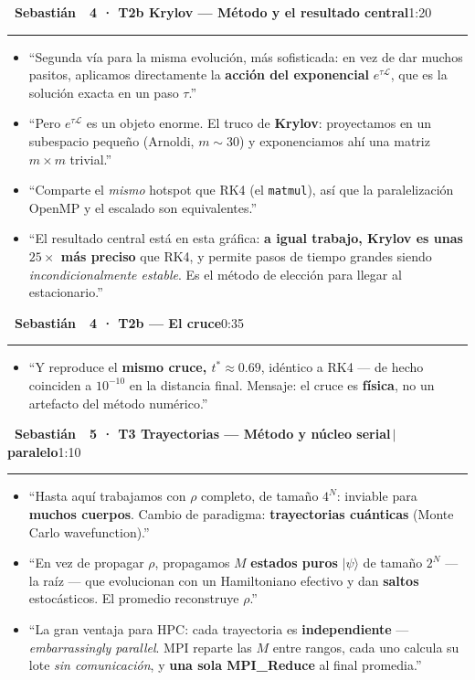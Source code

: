 \documentclass[11pt,a4paper]{article}
\newcommand{\Sb}{\colorbox{seb}{\color{white}\bfseries\footnotesize~Sebastián~}}
\newcommand{\cs}[1]{\textcolor{seb}{\textbf{#1}}}
\newcommand{\blk}[3]{%
  \par\medskip\noindent #1\ \textbf{#2}\hfill\textcolor{soft}{\small #3}\par
  \vspace{-4pt}\textcolor{soft!40}{\rule{\linewidth}{0.4pt}}\par\vspace{-2pt}}
\begin{document}
\blk{\Sb}{4 · T2b Krylov --- Método y el resultado central}{1:20}
\begin{itemize}
  \item ``Segunda vía para la misma evolución, más sofisticada: en vez de dar muchos
    pasitos, aplicamos directamente la \textbf{acción del exponencial}
    $e^{\tau\mathcal{L}}$, que es la solución exacta en un paso $\tau$.''
  \item ``Pero $e^{\tau\mathcal{L}}$ es un objeto enorme. El truco de \textbf{Krylov}:
    proyectamos en un subespacio pequeño (Arnoldi, $m\sim30$) y exponenciamos ahí una
    matriz $m\times m$ trivial.''
  \item ``Comparte el \emph{mismo} hotspot que RK4 (el \texttt{matmul}), así que la
    paralelización OpenMP y el escalado son equivalentes.''
  \item ``El resultado central está en esta gráfica: \textbf{a igual trabajo, Krylov es
    unas $25\times$ más preciso} que RK4, y permite pasos de tiempo grandes siendo
    \emph{incondicionalmente estable}. Es el método de elección para llegar al
    estacionario.''
\end{itemize}

\blk{\Sb}{4 · T2b --- El cruce}{0:35}
\begin{itemize}
  \item ``Y reproduce el \textbf{mismo cruce, $t^*\approx0.69$}, idéntico a RK4 --- de
    hecho coinciden a $10^{-10}$ en la distancia final. Mensaje: el cruce es
    \textbf{física}, no un artefacto del método numérico.''
\end{itemize}

\blk{\Sb}{5 · T3 Trayectorias --- Método y núcleo serial\,$\vert$\,paralelo}{1:10}
\begin{itemize}
  \item ``Hasta aquí trabajamos con $\rho$ completo, de tamaño $4^N$: inviable para
    \textbf{muchos cuerpos}. Cambio de paradigma: \textbf{trayectorias cuánticas}
    (Monte Carlo wavefunction).''
  \item ``En vez de propagar $\rho$, propagamos $M$ \textbf{estados puros}
    $|\psi\rangle$ de tamaño $2^N$ --- la raíz --- que evolucionan con un Hamiltoniano
    efectivo y dan \textbf{saltos} estocásticos. El promedio reconstruye $\rho$.''
  \item ``La gran ventaja para HPC: cada trayectoria es \textbf{independiente}
    --- \emph{embarrassingly parallel}. MPI reparte las $M$ entre rangos, cada uno
    calcula su lote \emph{sin comunicación}, y \textbf{una sola \cs{MPI\_Reduce}} al
    final promedia.''
\end{itemize}
\end{document}
